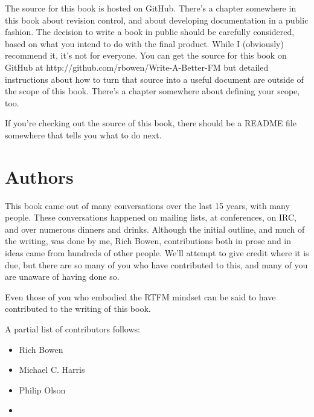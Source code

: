 The source for this book is hosted on GitHub. There's a chapter
somewhere in this book about revision control, and about developing
documentation in a public fashion. The decision to write a book in
public should be carefully considered, based on what you intend to do
with the final product. While I (obviously) recommend it, it's not for
everyone. You can get the source for this book on GitHub at
http://github.com/rbowen/Write-A-Better-FM but detailed instructions
about how to turn that source into a useful document are outside of the
scope of this book. There's a chapter somewhere about defining your
scope, too.

If you're checking out the source of this book, there should be a README
file somewhere that tells you what to do next.

\section{Authors}

This book came out of many conversations over the last 15 years, with
many people. These conversations happened on mailing lists, at
conferences, on IRC, and over numerous dinners and drinks. Although the
initial outline, and much of the writing, was done by me, Rich Bowen,
contributions both in prose and in ideas came from hundreds of other
people. We'll attempt to give credit where it is due, but there are so
many of you who have contributed to this, and many of you are unaware of
having done so.

Even those of you who embodied the RTFM mindset can be said to have
contributed to the writing of this book.

A partial list of contributors follows:

\begin{itemize}
\item Rich Bowen
\item Michael C. Harris
\item Philip Olson
\item 
\end{itemize}

